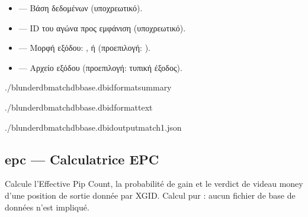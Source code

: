 \documentclass[letterpaper,10pt,greek]{sphinxmanual}
\begin{document}
\sphinxAtStartPar
{}
\begin{itemize}
\item {} 
\sphinxAtStartPar
{} — Βάση δεδομένων (υποχρεωτικό).

\item {} 
\sphinxAtStartPar
{} — ID του αγώνα προς εμφάνιση (υποχρεωτικό).

\item {} 
\sphinxAtStartPar
{} — Μορφή εξόδου: ,  ή  (προεπιλογή: ).

\item {} 
\sphinxAtStartPar
{} — Αρχείο εξόδου (προεπιλογή: τυπική έξοδος).

\end{itemize}

\sphinxAtStartPar
{}

\begin{sphinxVerbatim}[commandchars=\\\{\}]
./blunderdbmatch\PYGZhy{}\PYGZhy{}dbbase.db\PYGZhy{}\PYGZhy{}id\PYGZhy{}\PYGZhy{}formatsummary

./blunderdbmatch\PYGZhy{}\PYGZhy{}dbbase.db\PYGZhy{}\PYGZhy{}id\PYGZhy{}\PYGZhy{}formattext

./blunderdbmatch\PYGZhy{}\PYGZhy{}dbbase.db\PYGZhy{}\PYGZhy{}id\PYGZhy{}\PYGZhy{}outputmatch1.json
\end{sphinxVerbatim}


\subsection{epc — Calculatrice EPC}
\label{\detokenize{cli:epc-calculatrice-epc}}
\sphinxAtStartPar
Calcule l’Effective Pip Count, la probabilité de gain et le verdict de videau
money d’une position de sortie donnée par XGID. Calcul pur : aucun fichier de
base de données n’est impliqué.
\end{document}
